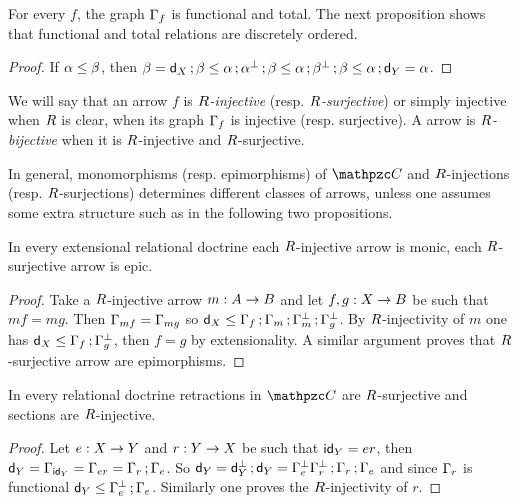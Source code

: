 For every $f$, the graph $\Gamma_{f}$ is functional and total. The next proposition shows that 
 functional and total relations are discretely ordered.

\begin{proof} 
If $\alpha\leq\beta$, then 
$\beta = \mathsf{d}_X\mathop{\mathbf{;}}\beta 
       \leq \alpha \mathop{\mathbf{;}} \alpha^{\bot} \mathop{\mathbf{;}} \beta 
       \leq \alpha \mathop{\mathbf{;}} \beta^{\bot} \mathop{\mathbf{;}} \beta 
       \leq \alpha \mathop{\mathbf{;}} \mathsf{d}_Y 
       = \alpha$.
\end{proof}


We will say that an arrow $f$ is 
\emph{$R$-injective} (resp. \emph{$R$-surjective}) or simply injective when $R$ is clear, when its graph $\Gamma_{f}$ is injective (resp. surjective). A arrow is \emph{$R$-bijective} when it is  $R$-injective and $R$-surjective.

In general, monomorphisms (resp. epimorphisms) of $\CC$ and $R$-injections (resp. $R$-surjections) determines different classes of arrows, unless one assumes some extra structure such as in the following two propositions.

\begin{proposition}\label{prop:extomonic}In every extensional relational doctrine \fun{\RDoc}{\bop\CC}{\Pos} each $R$-injective arrow is monic, each $R$-surjective arrow is epic.
\end{proposition}
\begin{proof} Take a $R$-injective arrow $\fun{m}{A}{B}$ and let $\fun{f,g}{X}{B}$ be such that $mf=mg$. Then $\Gamma_{mf}=\Gamma_{mg}$ so $\mathsf{d}_X\le \Gamma_{f}\mathop{\mathbf{;}}\Gamma_{m}\mathop{\mathbf{;}}\Gamma_{m}^{\bot}\mathop{\mathbf{;}}\Gamma_{g}^{\bot}$. By $R$-injectivity of $m$ one has $\mathsf{d}_X\le \Gamma_{f}\mathop{\mathbf{;}}\Gamma_{g}^{\bot}$, then $f=g$ by extensionality. A similar argument proves that $R$-surjective arrow are epimorphisms.
\end{proof}

\begin{proposition}\label{prop:splitepi}
In every  relational doctrine \fun{\RDoc}{\bop\CC}{\Pos} retractions in $\CC$ are $R$-surjective and sections are $R$-injective.
\end{proposition}
\begin{proof} 
Let $\fun{e}{X}{Y}$ and $\fun{r}{Y}{X}$ be such that  $\mathsf{id}_Y=er$, then $\mathsf{d}_Y=\Gamma_{\mathsf{id}_Y}=\Gamma_{er}=\Gamma_{r}\mathop{\mathbf{;}}\Gamma_{e}$. So $\mathsf{d}_Y= \mathsf{d}_Y^{\bot}\mathop{\mathbf{;}}\mathsf{d}_Y=\Gamma_{e}^{\bot}\Gamma_{r}^{\bot}\mathop{\mathbf{;}}\Gamma_{r}\mathop{\mathbf{;}}\Gamma_{e}$ and since $\Gamma_{r}$ is functional $\mathsf{d}_Y\le \Gamma_{e}^{\bot}\mathop{\mathbf{;}}\Gamma_{e}$. Similarly one proves the $R$-injectivity of $r$. 
\end{proof}




